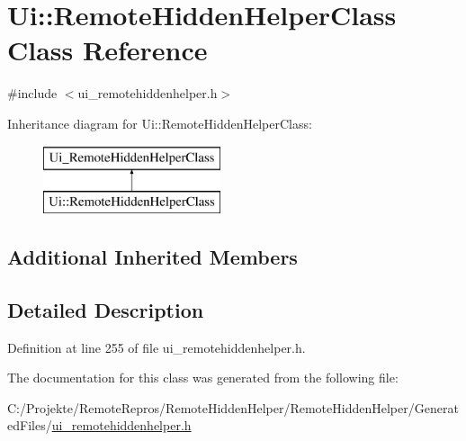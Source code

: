 \hypertarget{class_ui_1_1_remote_hidden_helper_class}{}\section{Ui\+:\+:Remote\+Hidden\+Helper\+Class Class Reference}
\label{class_ui_1_1_remote_hidden_helper_class}


{\ttfamily \#include $<$ui\+\_\+remotehiddenhelper.\+h$>$}

Inheritance diagram for Ui\+:\+:Remote\+Hidden\+Helper\+Class\+:\begin{figure}[H]
\begin{center}
\leavevmode
\includegraphics[height=2.000000cm]{class_ui_1_1_remote_hidden_helper_class}
\end{center}
\end{figure}
\subsection*{Additional Inherited Members}


\subsection{Detailed Description}


Definition at line 255 of file ui\+\_\+remotehiddenhelper.\+h.



The documentation for this class was generated from the following file\+:\begin{DoxyCompactItemize}
\item 
C\+:/\+Projekte/\+Remote\+Repros/\+Remote\+Hidden\+Helper/\+Remote\+Hidden\+Helper/\+Generated\+Files/\hyperlink{ui__remotehiddenhelper_8h}{ui\+\_\+remotehiddenhelper.\+h}\end{DoxyCompactItemize}
